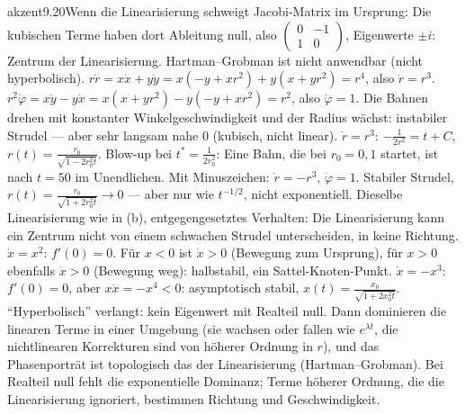 \begin{loesungkarte}{akzent}{9.20}{Wenn die Linearisierung schweigt}
Jacobi-Matrix im Ursprung: Die kubischen Terme haben dort Ableitung null, also $\begin{pmatrix}0&-1\\1&0\end{pmatrix}$, Eigenwerte $\pm i$: Zentrum der Linearisierung. Hartman--Grobman ist nicht anwendbar (nicht hyperbolisch).
$r\dot r = x\dot x + y\dot y = x(-y + xr^{2}) + y(x + yr^{2}) = r^{4}$, also $\dot r = r^{3}$. $r^{2}\dot\varphi = x\dot y - y\dot x = x(x + yr^{2}) - y(-y + xr^{2}) = r^{2}$, also $\dot\varphi = 1$. Die Bahnen drehen mit konstanter Winkelgeschwindigkeit und der Radius wächst: instabiler Strudel --- aber sehr langsam nahe $0$ (kubisch, nicht linear). $\dot r = r^{3}$: $-\frac1{2r^{2}} = t + C$, $r(t) = \frac{r_0}{\sqrt{1 - 2r_0^{2}t}}$. Blow-up bei $t^{*} = \frac1{2r_0^{2}}$: Eine Bahn, die bei $r_0 = 0{,}1$ startet, ist nach $t = 50$ im Unendlichen.
Mit Minuszeichen: $\dot r = -r^{3}$, $\dot\varphi = 1$. Stabiler Strudel, $r(t) = \frac{r_0}{\sqrt{1 + 2r_0^{2}t}}\to0$ --- aber nur wie $t^{-1/2}$, nicht exponentiell. Dieselbe Linearisierung wie in (b), entgegengesetztes Verhalten: Die Linearisierung kann ein Zentrum nicht von einem schwachen Strudel unterscheiden, in keine Richtung.
$\dot x = x^{2}$: $f'(0) = 0$. Für $x < 0$ ist $\dot x > 0$ (Bewegung zum Ursprung), für $x > 0$ ebenfalls $\dot x > 0$ (Bewegung weg): halbstabil, ein Sattel-Knoten-Punkt. $\dot x = -x^{3}$: $f'(0) = 0$, aber $x\dot x = -x^{4} < 0$: asymptotisch stabil, $x(t) = \frac{x_0}{\sqrt{1 + 2x_0^{2}t}}$. \enquote{Hyperbolisch} verlangt: kein Eigenwert mit Realteil null. Dann dominieren die linearen Terme in einer Umgebung (sie wachsen oder fallen wie $e^{\lambda t}$, die nichtlinearen Korrekturen sind von höherer Ordnung in $r$), und das Phasenporträt ist topologisch das der Linearisierung (Hartman--Grobman). Bei Realteil null fehlt die exponentielle Dominanz; Terme höherer Ordnung, die die Linearisierung ignoriert, bestimmen Richtung und Geschwindigkeit.
\begin{fehler}\kastentext

\end{fehler}
\end{loesungkarte}
